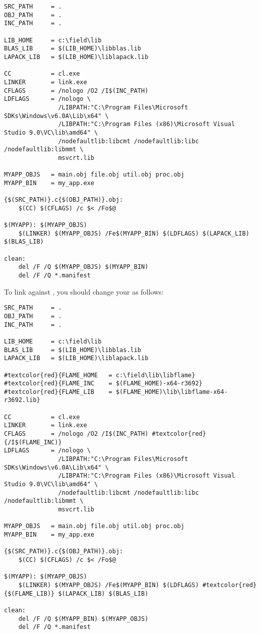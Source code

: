 \begin{Verbatim}[frame=single,framesep=2.5mm,xleftmargin=5mm,commandchars=\#\{\},fontsize=\footnotesize]
SRC_PATH     = .
OBJ_PATH     = .
INC_PATH     = .

LIB_HOME     = c:\field\lib
BLAS_LIB     = $(LIB_HOME)\libblas.lib
LAPACK_LIB   = $(LIB_HOME)\liblapack.lib

CC           = cl.exe
LINKER       = link.exe
CFLAGS       = /nologo /O2 /I$(INC_PATH)
LDFLAGS      = /nologo \
               /LIBPATH:"C:\Program Files\Microsoft SDKs\Windows\v6.0A\Lib\x64" \
               /LIBPATH:"C:\Program Files (x86)\Microsoft Visual Studio 9.0\VC\lib\amd64" \
               /nodefaultlib:libcmt /nodefaultlib:libc /nodefaultlib:libmmt \
               msvcrt.lib

MYAPP_OBJS   = main.obj file.obj util.obj proc.obj
MYAPP_BIN    = my_app.exe

{$(SRC_PATH)}.c{$(OBJ_PATH)}.obj:
    $(CC) $(CFLAGS) /c $< /Fo$@

$(MYAPP): $(MYAPP_OBJS)
	$(LINKER) $(MYAPP_OBJS) /Fe$(MYAPP_BIN) $(LDFLAGS) $(LAPACK_LIB) $(BLAS_LIB)

clean:
    del /F /Q $(MYAPP_OBJS) $(MYAPP_BIN)
    del /F /Q *.manifest
\end{Verbatim}

\noindent
To link against \libflame, you should change your \makefile as follows:

\begin{Verbatim}[frame=single,framesep=2.5mm,xleftmargin=5mm,commandchars=\#\{\},fontsize=\footnotesize]
SRC_PATH     = .
OBJ_PATH     = .
INC_PATH     = .

LIB_HOME     = c:\field\lib
BLAS_LIB     = $(LIB_HOME)\libblas.lib
LAPACK_LIB   = $(LIB_HOME)\liblapack.lib

#textcolor{red}{FLAME_HOME   = c:\field\lib\libflame}
#textcolor{red}{FLAME_INC    = $(FLAME_HOME)-x64-r3692}
#textcolor{red}{FLAME_LIB    = $(FLAME_HOME)\lib\libflame-x64-r3692.lib}

CC           = cl.exe
LINKER       = link.exe
CFLAGS       = /nologo /O2 /I$(INC_PATH) #textcolor{red}{/I$(FLAME_INC)}
LDFLAGS      = /nologo \
               /LIBPATH:"C:\Program Files\Microsoft SDKs\Windows\v6.0A\Lib\x64" \
               /LIBPATH:"C:\Program Files (x86)\Microsoft Visual Studio 9.0\VC\lib\amd64" \
               /nodefaultlib:libcmt /nodefaultlib:libc /nodefaultlib:libmmt \
               msvcrt.lib

MYAPP_OBJS   = main.obj file.obj util.obj proc.obj
MYAPP_BIN    = my_app.exe

{$(SRC_PATH)}.c{$(OBJ_PATH)}.obj:
    $(CC) $(CFLAGS) /c $< /Fo$@

$(MYAPP): $(MYAPP_OBJS)
	$(LINKER) $(MYAPP_OBJS) /Fe$(MYAPP_BIN) $(LDFLAGS) #textcolor{red}{$(FLAME_LIB)} $(LAPACK_LIB) $(BLAS_LIB)

clean:
    del /F /Q $(MYAPP_BIN) $(MYAPP_OBJS)
    del /F /Q *.manifest
\end{Verbatim}

